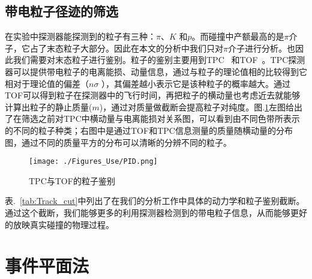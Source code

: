 \subsection{带电粒子径迹的筛选}
在实验中探测器能探测到的粒子有三种：$\pi$、$K$ 和$p$。而碰撞中产额最高的是$\pi$介子，它占了末态粒子大部分。因此在本文的分析中我们只对$\pi$介子进行分析。也因此我们需要对末态粒子进行鉴别。粒子的鉴别主要用到TPC~\cite{Anderson:2003ur} 和TOF~\cite{Llope:2005yw}。TPC探测器可以提供带电粒子的电离能损、动量信息，通过与粒子的理论值相的比较得到它相对于理论值的偏差（$n\sigma$ ），其偏差越小表示它是该种粒子的概率越大。通过TOF可以得到粒子在探测器中的飞行时间，再把粒子的横动量也考虑近去就能够计算出粒子的静止质量($m$)，通过对质量做截断会提高粒子对纯度。图.\ref{Fig:PID}左图给出了在筛选之前对TPC中横动量与电离能损对关系图，可以看到由不同色带所表示的不同的粒子种类；右图中是通过TOF和TPC信息测量的质量随横动量的分布图，通过不同的质量平方的分布可以清晰的分辨不同的粒子。
\begin{figure}[htbp]
\centering
\texttt{[image: ./Figures\_Use/PID.png]}
\caption{TPC与TOF的粒子鉴别}
\label{Fig:PID}
\end{figure}
表.~\ref{tab:Track_cut}中列出了在我们的分析工作中具体的动力学和粒子鉴别截断。通过这个截断，我们能够更多的利用探测器检测到的带电粒子信息，从而能够更好的放映真实碰撞的物理过程。
\begin{table}[htb]
\centering
\caption{数据分析中具体的动力学、粒子鉴别所用的截断}
    \centering
\label{tab:Track_cut}
\end{table}




\bigskip
\section{事件平面法}


